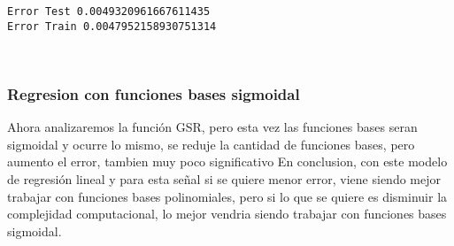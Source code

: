 \documentclass[11pt]{article}
\begin{document}
    \begin{Verbatim}[commandchars=\\\{\}]
Error Test 0.0049320961667611435
Error Train 0.0047952158930751314

    \end{Verbatim}

    \begin{center}
    \end{center}
    { \hspace*{\fill} \\}
    
    \subsubsection{Regresion con funciones bases
sigmoidal}\label{regresion-con-funciones-bases-sigmoidal}

    Ahora analizaremos la función GSR, pero esta vez las funciones bases
seran sigmoidal y ocurre lo mismo, se reduje la cantidad de funciones
bases, pero aumento el error, tambien muy poco significativo En
conclusion, con este modelo de regresión lineal y para esta señal si se
quiere menor error, viene siendo mejor trabajar con funciones bases
polinomiales, pero si lo que se quiere es disminuir la complejidad
computacional, lo mejor vendria siendo trabajar con funciones bases
sigmoidal.
\end{document}

